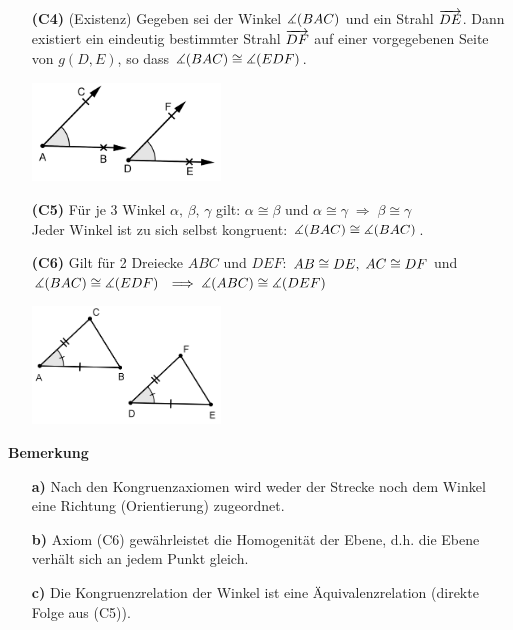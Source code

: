 \begin{enumerate}
    \item[{\bf(C4)}] (Existenz) Gegeben sei der Winkel $\mbox{$\measuredangle$}(BAC)$ und
    ein Strahl $\mbox{${\overrightarrow{DE}}$}$. Dann existiert ein eindeutig bestimmter
    Strahl $\mbox{${\overrightarrow{DF}}$}$ auf einer vorgegebenen Seite von $g(D,E)$, so
    dass $\mbox{$\measuredangle$}(BAC)\cong\mbox{$\measuredangle$}(EDF)$.


\centerline{\includegraphics[width=5cm]{BILDER/1-2-08-C4.png}}


    \item[{\bf(C5)}] F\"{u}r je 3 Winkel $\alpha,\,\beta,\,\gamma$ gilt:
    $\alpha\cong\beta$ und
    $\alpha\cong\gamma\;\Longrightarrow\;\beta\cong\gamma$\\
%
%
    Jeder Winkel ist zu sich selbst
    kongruent: $\mbox{$\measuredangle$}(BAC)\cong\mbox{$\measuredangle$}(BAC)$.


    \item[{\bf(C6)}]
    Gilt f\"{u}r 2 Dreiecke $ABC$ und $DEF$:
    ${AB}\cong{DE},\;{AC}\cong{DF}$
    und $\mbox{$\measuredangle$}(BAC)\cong\mbox{$\measuredangle$}(EDF)\;$
    $\Longrightarrow\;\mbox{$\measuredangle$}(ABC)\cong\mbox{$\measuredangle$}(DEF)$ %


\centerline{\includegraphics[width=5cm]{BILDER/1-2-08-C6.png}}

\end{enumerate}



{\bf Bemerkung }
\begin{enumerate}
\item[\textbf{a)}]Nach den Kongruenzaxiomen wird weder der Strecke noch dem Winkel
eine Richtung (Orientierung) zugeordnet.
\item[\textbf{b)}]Axiom (C6) gew\"{a}hrleistet die Homogenit\"{a}t der
  Ebene, d.h. die Ebene verhält sich an jedem Punkt gleich. 
\item[\textbf{c)}]Die Kongruenzrelation der Winkel ist eine
\"{A}quivalenzrelation (direkte Folge aus (C5)).
\end{enumerate}




